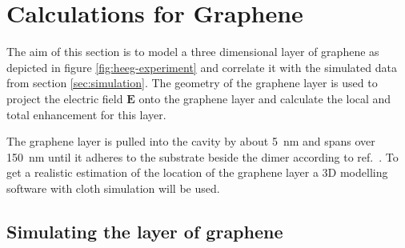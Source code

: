 \newpage
\null
\newpage
\section{Calculations for Graphene}
\label{sec:calculations}

The aim of this section is to model a three dimensional layer of graphene as depicted in figure \ref{fig:heeg-experiment} and correlate it with the simulated data from section \ref{sec:simulation}. The geometry of the graphene layer is used to project the electric field $\mathbf{E}$ onto the graphene layer and calculate the local and total enhancement for this layer.

The graphene layer is pulled into the cavity by about \SI{5}{nm} and spans over \SI{150}{nm} until it adheres to the substrate beside the dimer according to ref.~\cite{heeg}. To get a realistic estimation of the location of the graphene layer a 3D modelling software with cloth simulation will be used.

\subsection{Simulating the layer of graphene}

